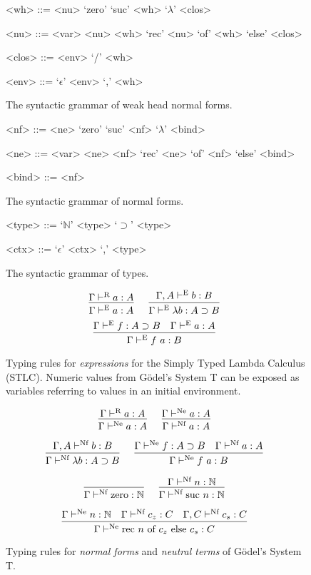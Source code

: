 \documentclass[preprint,authoryear]{sigplanconf}
\def\turnstyle{\vdash}
\def\asc{:}
\def\arr{\supset}
\def\nat{\mathbb{N}}
\def\emp{\epsilon}
\def\zero{\con{zero}}
\newcommand{\suc}[1]{\con{suc}~#1}
\newcommand{\rec}[3]{\con{rec}~#1~\con{of}~#2~\con{else}~#3}
\newcommand{\con}[1]{\textmd{#1}}
\newcommand{\turn}[1]{\turnstyle^\con{#1}}
\newcommand{\typr}[2]{\Gamma \turn{R}  #1 \asc #2}
\newcommand{\type}[2]{\ctype{\Gamma}{#1}{#2}}
\newcommand{\ctype}[3]{#1 \turn{E}  #2 \asc #3}
\newcommand{\typnf}[2]{\ctypnf{\Gamma}{#1}{#2}}
\newcommand{\ctypnf}[3]{#1 \turn{Nf}  #2 \asc #3}
\newcommand{\typne}[2]{\Gamma \turn{Ne}  #1 \asc #2}
\begin{document}
\begin{figure}[t!]
\caption{
The syntactic grammar of weak head normal forms.
}
\begin{grammar}
<wh> ::= <nu> 
\alt `zero'
\alt `suc' <wh>
\alt `\(\lambda\)' <clos>

<nu> ::= <var> 
\alt <nu> <wh>
\alt `rec' <nu> `of' <wh> `else' <clos>

<clos> ::= <env> `/' <wh>

<env> ::= `\(\emp\)'
\alt <env> `,' <wh>
\end{grammar}
\label{fig:gram:wh}
\end{figure}

\begin{figure}[t!]
\caption{
The syntactic grammar of normal forms.
}
\begin{grammar}
<nf> ::= <ne> 
\alt `zero'
\alt `suc' <nf>
\alt `\(\lambda\)' <bind>

<ne> ::= <var> 
\alt <ne> <nf>
\alt `rec' <ne> `of' <nf> `else' <bind>

<bind> ::= <nf> 
\end{grammar}
\label{fig:gram:nf}
\end{figure}

\begin{figure}[t!]
\caption{
The syntactic grammar of types.
}
\begin{grammar}
<type> ::= `\(\nat\)'
\alt <type> `\(\arr\)' <type>

<ctx> ::= `\(\emp\)'
\alt <ctx> `,' <type>
\end{grammar}
\label{fig:gram:type}
\end{figure}

\begin{figure}[t!]
\caption{
Typing rules for \textit{expressions} for the Simply Typed Lambda
Calculus (STLC). Numeric values from G{\"o}del's System T can be
exposed as variables referring to values in an initial environment.
}
$$
\infer
  []
  {\type{a}{A}}
{
  \typr{a}{A}
}
\quad
\infer
  []
  {\type{\lambda b}{A \arr B}}
{
  \ctype{\Gamma, A}{b}{B}
}
$$
$$
\infer
  []
  {\type{f~a}{B}}
{
  \type{f}{A \arr B}
  &
  \type{a}{A}
}
$$
\label{fig:type:exp}
\end{figure}

\begin{figure}[t!]
\caption{
Typing rules for \textit{normal forms} and \textit{neutral terms} of G{\"o}del's System T.
}
$$
\infer
  []
  {\typne{a}{A}}
{
  \typr{a}{A}
}
\quad
\infer
  []
  {\typnf{a}{A}}
{
  \typne{a}{A}
}
$$

$$
\infer
  []
  {\typnf{\lambda b}{A \arr B}}
{
  \ctypnf{\Gamma, A}{b}{B}
}
\quad
\infer
  []
  {\typne{f~a}{B}}
{
  \typne{f}{A \arr B}
  &
  \typnf{a}{A}
}
$$

$$
\infer
  []
  {\typnf{\zero}{\nat}}
{
}
\quad
\infer
  []
  {\typnf{\suc{n}}{\nat}}
{
  \typnf{n}{\nat}
}
$$

$$
\infer
  []
  {\typne{\rec{n}{c_z}{c_s}}{C}}
{
  \typne{n}{\nat}
  &
  \typnf{c_z}{C}
  &
  \ctypnf{\Gamma, C}{c_s}{C}
}
$$

\label{fig:type:nf}
\end{figure}
\end{document}
